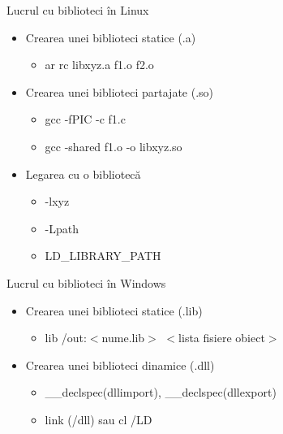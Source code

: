 \documentclass{so.cs.pub.ro}
\begin{document}
\begin{frame}{Lucrul cu biblioteci în Linux}
	\begin{itemize}
		\item Crearea unei biblioteci statice (.a)
		\begin{itemize}
			\item ar rc libxyz.a f1.o f2.o
		\end{itemize}
		\item Crearea unei biblioteci partajate (.so)
		\begin{itemize}
			\item gcc -fPIC -c f1.c
			\item gcc -shared f1.o -o libxyz.so 
		\end{itemize}
		\item Legarea cu o bibliotecă
		\begin{itemize}
			\item -lxyz
			\item -L{path} 
			\item LD_LIBRARY_PATH
		\end{itemize}
	\end{itemize}
\end{frame}

\begin{frame}{Lucrul cu biblioteci în Windows}
	\begin{itemize}
			\item Crearea unei biblioteci statice (.lib)
			\begin{itemize}
				\item lib /out:$<$nume.lib$>$ $<$lista fisiere obiect$>$
			\end{itemize}
			\item Crearea unei biblioteci dinamice (.dll)
			\begin{itemize}
				\item __declspec(dllimport), __declspec(dllexport)
				\item link (/dll) sau cl /LD
			\end{itemize}
	\end{itemize}
\end{frame}

\end{document}
